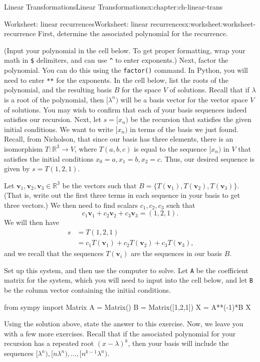 \documentclass[oneside,10pt,]{book}
\newcommand{\mono}[1]{\texttt{#1}}
\numberwithin{equation}{section}
\newcommand{\R}{\mathbb{R}}
\newcommand{\vv}{\mathbf{v}}
\newcommand{\amp}{&}
\begin{document}
\begin{chapterptx}{Linear Transformations}{}{Linear Transformations}{}{}{x:chapter:ch-linear-trans}
\begin{worksheet-section}{Worksheet: linear recurrences}{}{Worksheet: linear recurrences}{}{}{x:worksheet:worksheet-recurrence}
First, determine the associated polynomial for the recurrence.%
\par
(Input your polynomial in the cell below. To get proper formatting, wrap your math in \mono{\$} delimiters, and can use \mono{\textasciicircum{}} to enter exponents.)%
Next, factor the polynomial. You can do this using the \mono{factor()} command. In Python, you will need to enter \mono{**} for the exponents.%
In the cell below, list the roots of the polynomial, and the resulting basis \(B\) for the space \(V\) of solutions. Recall that if \(\lambda\) is a root of the polynomial, then \([\lambda^n)\) will be a basis vector for the vector space \(V\) of solutions. You may wish to confirm that each of your basis sequences indeed satisfies our recursion.%
\clearpage
Next, let \(s=[x_n)\) be the recursion that satisfies the given initial conditions. We want to write \([x_n)\) in terms of the basis we just found. Recall, from Nicholson, that since our basis has three elements, there is an isomorphism \(T:\R^3\to V\), where \(T(a,b,c)\) is equal to the sequence \([x_n)\) in \(V\) that satisfies the initial conditions \(x_0=a, x_1=b, x_2=c\). Thus, our desired sequence is given by \(s=T(1,2,1)\).%
\par
Let \(\vv_1, \vv_2, \vv_3\in\R^3\) be the vectors such that \(B=\{T(\vv_1), T(\vv_2), T(\vv_3)\}\). (That is, write out the first three terms in each sequence in your basis to get three vectors.) We then need to find scalars \(c_1,c_2,c_3\) such that%
\begin{equation*}
c_1\vv_1+c_2\vv_2+c_3\vv_3=(1,2,1)\text{.}
\end{equation*}
We will then have%
\begin{align*}
s \amp = T(1,2,1)\\
\amp = c_1T(\vv_1)+c_2T(\vv_2)+c_3T(\vv_3)\text{,}
\end{align*}
and we recall that the sequences \(T(\vv_i)\) are the sequences in our basis \(B\).%
\par
Set up this system, and then use the computer to solve. Let \mono{A} be the coefficient matrix for the system, which you will need to input into the cell below, and let \mono{B} be the column vector containing the initial conditions.%
\begin{sageinput}
from sympy import Matrix
A = Matrix()
B = Matrix([1,2,1])
X = A**(-1)*B
X
\end{sageinput}
Using the solution above, state the answer to this exercise.%
Now, we leave you with a few more exercises. Recall that if the associated polynomial for your recursion has a repeated root \((x-\lambda)^k\), then your basis will include the sequences \([\lambda^n), [n\lambda^n), \ldots, [n^{k-1}\lambda^n)\).%

\end{worksheet-section}
\end{chapterptx}
\end{document}
